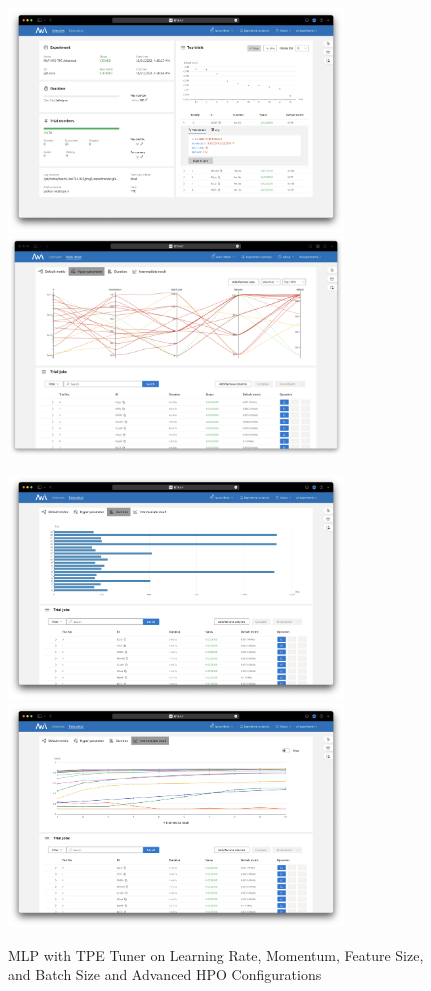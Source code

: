 \documentclass{article}
\begin{document}
\begin{figure}
    \centerline{\includegraphics[width=3.5in]{../proj3/figures/mlp_tpe_batch_advanced_overview.png}\includegraphics[width=3.5in]{../proj3/figures/mlp_tpe_batch_advanced_hyperparameter.png}}
    \centerline{\includegraphics[width=3.5in]{../proj3/figures/mlp_tpe_batch_advanced_latency.png}\includegraphics[width=3.5in]{../proj3/figures/mlp_tpe_batch_advanced_intermediate.png}}
    \caption{MLP with TPE Tuner on Learning Rate, Momentum, Feature Size, and Batch Size and Advanced HPO Configurations}
    \label{fig:mlp-tpe-batch-advanced}
\end{figure}
\end{document}
